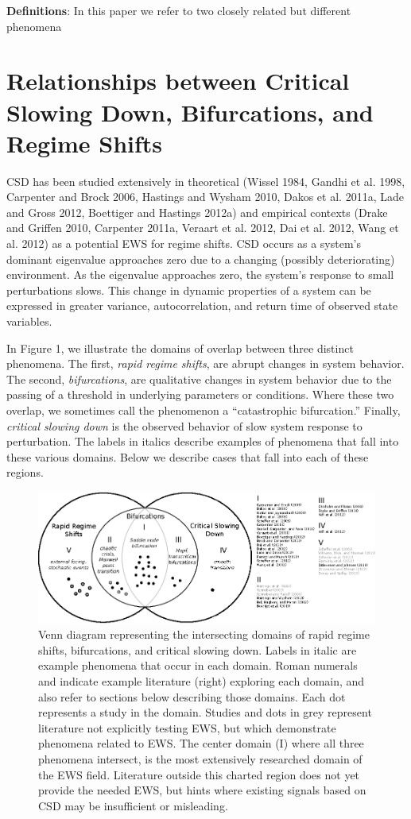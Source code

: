 \documentclass{article}
\begin{document}
\textbf{Definitions}: In this paper we refer to two closely related but
different phenomena

\section{Relationships between Critical Slowing Down, Bifurcations, and
Regime Shifts}

CSD has been studied extensively in theoretical (Wissel 1984, Gandhi et
al. 1998, Carpenter and Brock 2006, Hastings and Wysham 2010, Dakos et
al. 2011a, Lade and Gross 2012, Boettiger and Hastings 2012a) and
empirical contexts (Drake and Griffen 2010, Carpenter 2011a, Veraart et
al. 2012, Dai et al. 2012, Wang et al. 2012) as a potential EWS for
regime shifts. CSD occurs as a system's dominant eigenvalue approaches
zero due to a changing (possibly deteriorating) environment. As the
eigenvalue approaches zero, the system's response to small perturbations
slows. This change in dynamic properties of a system can be expressed in
greater variance, autocorrelation, and return time of observed state
variables.

In Figure 1, we illustrate the domains of overlap between three distinct
phenomena. The first, \emph{rapid regime shifts}, are abrupt changes in
system behavior. The second, \emph{bifurcations}, are qualitative
changes in system behavior due to the passing of a threshold in
underlying parameters or conditions. Where these two overlap, we
sometimes call the phenomenon a ``catastrophic bifurcation.'' Finally,
\emph{critical slowing down} is the observed behavior of slow system
response to perturbation. The labels in italics describe examples of
phenomena that fall into these various domains. Below we describe cases
that fall into each of these regions.

\begin{figure}[htbp]
\centering
\includegraphics{ews-venn.eps}
\caption{Venn diagram representing the intersecting domains of rapid
regime shifts, bifurcations, and critical slowing down. Labels in italic
are example phenomena that occur in each domain. Roman numerals and
indicate example literature (right) exploring each domain, and also
refer to sections below describing those domains. Each dot represents a
study in the domain. Studies and dots in grey represent literature not
explicitly testing EWS, but which demonstrate phenomena related to EWS.
The center domain (I) where all three phenomena intersect, is the most
extensively researched domain of the EWS field. Literature outside this
charted region does not yet provide the needed EWS, but hints where
existing signals based on CSD may be insufficient or misleading.}
\end{figure}
\end{document}
